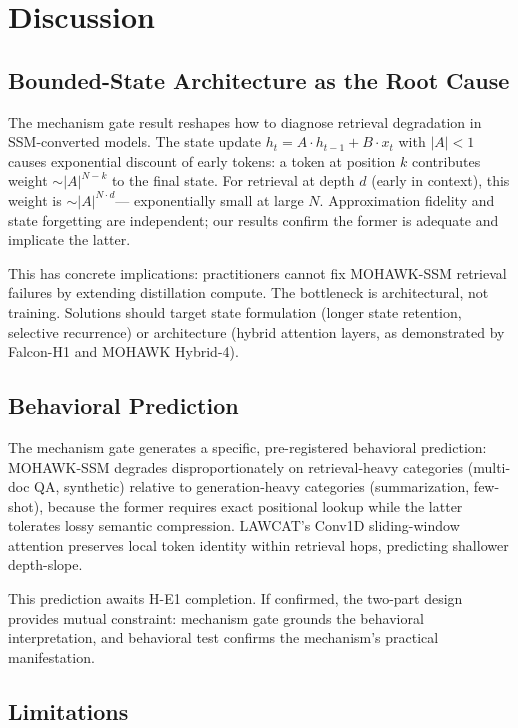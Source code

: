 \section{Discussion}

\subsection{Bounded-State Architecture as the Root Cause}

The mechanism gate result reshapes how to diagnose retrieval degradation in SSM-converted models.
The state update $h_t = A \cdot h_{t-1} + B \cdot x_t$ with $|A| < 1$ causes exponential
discount of early tokens: a token at position $k$ contributes weight $\sim|A|^{N-k}$ to the
final state. For retrieval at depth $d$ (early in context), this weight is $\sim|A|^{N \cdot d}$---
exponentially small at large $N$. Approximation fidelity and state forgetting are independent;
our results confirm the former is adequate and implicate the latter.

This has concrete implications: practitioners cannot fix MOHAWK-SSM retrieval failures by
extending distillation compute. The bottleneck is architectural, not training. Solutions should
target state formulation (longer state retention, selective recurrence) or architecture
(hybrid attention layers, as demonstrated by Falcon-H1 \citep{Zuo2025FalconH1} and MOHAWK
Hybrid-4).

\subsection{Behavioral Prediction}

The mechanism gate generates a specific, pre-registered behavioral prediction: MOHAWK-SSM
degrades disproportionately on retrieval-heavy categories (multi-doc QA, synthetic) relative to
generation-heavy categories (summarization, few-shot), because the former requires exact
positional lookup while the latter tolerates lossy semantic compression. LAWCAT's Conv1D
sliding-window attention preserves local token identity within retrieval hops, predicting
shallower depth-slope.

This prediction awaits H-E1 completion. If confirmed, the two-part design provides mutual
constraint: mechanism gate grounds the behavioral interpretation, and behavioral test confirms
the mechanism's practical manifestation.

\subsection{Limitations}

